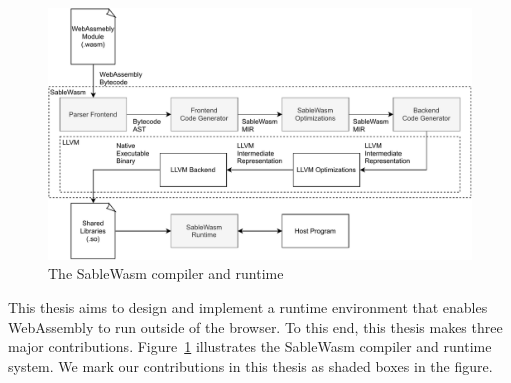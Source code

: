 \begin{figure}
    \centering
    \includegraphics[width=\textwidth]{Images/design}
    \caption{The SableWasm compiler and runtime}
    \label{fig:design}
\end{figure}

This thesis aims to design and implement a runtime environment that enables
WebAssembly to run outside of the browser. To this end, this thesis makes three
major contributions. Figure~\ref{fig:design} illustrates the SableWasm compiler
and runtime system. We mark our contributions in this thesis as shaded boxes
in the figure.

